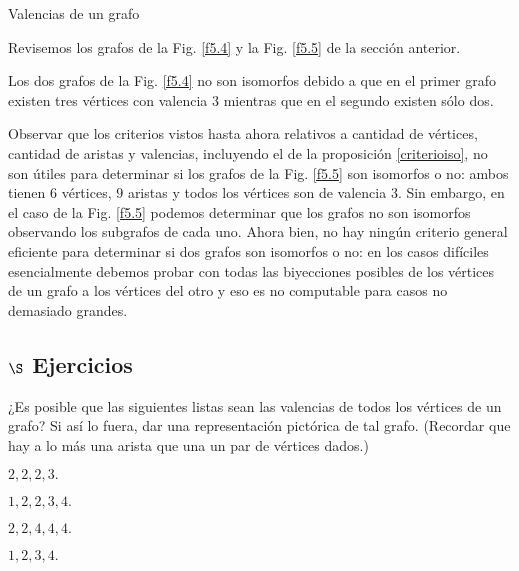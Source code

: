 \begin{section}{Valencias de un grafo}
\begin{ejemplo*} Revisemos los grafos de la Fig. \ref{f5.4} y la Fig. \ref{f5.5} de la sección anterior. 

Los dos grafos de la Fig. \ref{f5.4}  no son isomorfos debido a que en el primer grafo existen tres vértices con valencia $3$ mientras que en el segundo existen sólo dos.

Observar que los criterios vistos hasta ahora relativos a cantidad de vértices,  cantidad de aristas y valencias, incluyendo el de la proposición \ref{criterioiso}, no son útiles para determinar si los grafos de  la Fig. \ref{f5.5} son isomorfos o no: ambos tienen $6$ vértices, $9$ aristas y todos los vértices son de valencia $3$. Sin embargo, en el caso de la Fig. \ref{f5.5} podemos determinar que los grafos no son isomorfos observando los subgrafos de cada uno. Ahora bien, no  hay ningún criterio general eficiente para determinar si dos grafos son isomorfos o no: en los casos difíciles esencialmente debemos probar con todas las biyecciones posibles de los vértices de un grafo a los vértices del otro y eso es no computable para casos no demasiado  grandes.   
\end{ejemplo*}

\subsection*{$\S$ Ejercicios}\label{ejercicios5.3}
\begin{enumex}
\item ¿Es posible que las siguientes listas sean las valencias de todos los vértices de un grafo? Si así lo fuera, dar una representación pictórica de tal grafo. (Recordar que hay a lo más una arista que una un par de
vértices dados.)
    \begin{enumex}
        \begin{minipage}{0.4\textwidth}
            \item $2,2,2,3.$
        \end{minipage}
        \begin{minipage}{0.4\textwidth}
            \item $1,2,2,3,4.$
        \end{minipage}

        \begin{minipage}{0.4\textwidth}
            \item $2,2,4,4,4.$
        \end{minipage}
        \begin{minipage}{0.4\textwidth}
            \item $1,2,3,4.$
        \end{minipage}
    \end{enumex}



\end{enumex}
\end{section}
